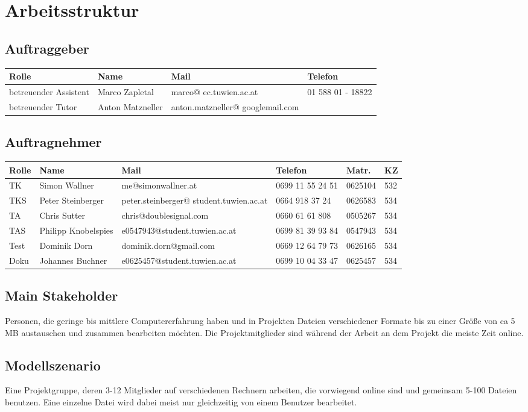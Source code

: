 
\section{Arbeitsstruktur}
\subsection{Auftraggeber}
\begin{tabular}{ | l | l | p{3.5cm} | p{4cm} |}
\hline
\textbf{Rolle} & \textbf{Name} & \textbf{Mail} & \textbf{Telefon} \\
\hline
betreuender Assistent & Marco Zapletal & marco@ ec.tuwien.ac.at & 01 588 01 - 18822 \\
\hline
betreuender Tutor & Anton Matzneller & anton.matzneller@ googlemail.com &  \\
\hline
\end{tabular}

\subsection{Auftragnehmer}
\begin{tabular}{ | l | l | p{5.5cm} | p{1.7cm} | l | l |}
\hline
\textbf{Rolle} & \textbf{Name} & \textbf{Mail} & \textbf{Telefon} & \textbf{Matr.} & \textbf{KZ} \\
\hline
TK & Simon Wallner & me@simonwallner.at & 0699 11 55 24 51 & 0625104 & 532 \\
\hline
TKS & Peter Steinberger & peter.steinberger@ student.tuwien.ac.at & 0664 918 37 24 & 0626583 & 534 \\
\hline
TA & Chris Sutter & chris@doublesignal.com & 0660 61 61 808 & 0505267 & 534 \\
\hline
TAS & Philipp Knobelspies & e0547943@student.tuwien.ac.at & 0699 81 39 93 84 & 0547943 & 534 \\
\hline
Test & Dominik Dorn & dominik.dorn@gmail.com & 0669 12 64 79 73 & 0626165 & 534 \\
\hline
Doku & Johannes Buchner & e0625457@student.tuwien.ac.at & 0699 10 04 33 47 & 0625457 & 534 \\
\hline
\end{tabular}

\subsection{Main Stakeholder}
Personen, die geringe bis mittlere Computererfahrung haben und in Projekten Dateien verschiedener Formate bis zu einer Größe von ca 5 MB austauschen und zusammen bearbeiten möchten. Die Projektmitglieder sind während der Arbeit an dem Projekt die meiste Zeit online.
\subsection{Modellszenario}

Eine Projektgruppe, deren 3-12 Mitglieder auf verschiedenen Rechnern arbeiten, die vorwiegend online sind und gemeinsam 5-100 Dateien benutzen. Eine einzelne Datei wird dabei meist nur gleichzeitig von einem Benutzer bearbeitet.

